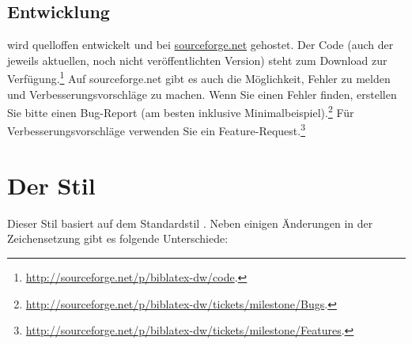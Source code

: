 \documentclass[ngerman]{scrartcl}
\begin{document}
\subsection{Entwicklung}
\bldw{} wird quelloffen entwickelt und bei \href{http://sourceforge.net}{sourceforge.net} gehostet. Der Code (auch der jeweils aktuellen, noch nicht veröffentlichten Version) steht zum Download zur Verfügung.\footnote{\url{http://sourceforge.net/p/biblatex-dw/code}.} Auf sourceforge.net gibt es auch die Möglichkeit, Fehler zu melden und Verbesserungsvorschläge zu machen. Wenn Sie einen Fehler finden, erstellen Sie bitte einen Bug-Report (am besten inklusive Minimalbeispiel).\footnote{\url{http://sourceforge.net/p/biblatex-dw/tickets/milestone/Bugs}.} Für Verbesserungsvorschläge verwenden Sie ein Feature-Request.\footnote{\url{http://sourceforge.net/p/biblatex-dw/tickets/milestone/Features}.}

\section{Der Stil }

Dieser Stil basiert auf dem Standardstil .
Neben einigen Änderungen in der Zeichensetzung gibt es folgende Unterschiede:
\end{document}
